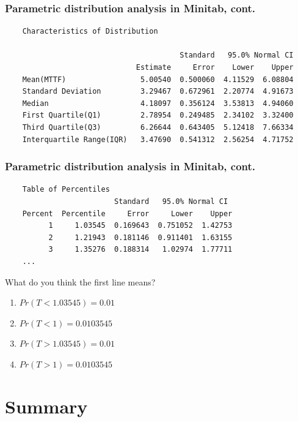 \begin{frame}[fragile]
\frametitle{Parametric distribution analysis in Minitab, cont.}
\begin{verbatim}
    Characteristics of Distribution

                                        Standard   95.0% Normal CI
                              Estimate     Error    Lower    Upper
    Mean(MTTF)                 5.00540  0.500060  4.11529  6.08804
    Standard Deviation         3.29467  0.672961  2.20774  4.91673
    Median                     4.18097  0.356124  3.53813  4.94060
    First Quartile(Q1)         2.78954  0.249485  2.34102  3.32400
    Third Quartile(Q3)         6.26644  0.643405  5.12418  7.66334
    Interquartile Range(IQR)   3.47690  0.541312  2.56254  4.71752
\end{verbatim}
\end{frame}

\begin{frame}[fragile]
\frametitle{Parametric distribution analysis in Minitab, cont.}
\begin{verbatim}
    Table of Percentiles
                         Standard   95.0% Normal CI
    Percent  Percentile     Error     Lower    Upper
          1     1.03545  0.169643  0.751052  1.42753
          2     1.21943  0.181146  0.911401  1.63155
          3     1.35276  0.188314   1.02974  1.77711
    ...
\end{verbatim}
\vskip10pt
\begin{clicker}{What do you think the first line means?}
\begin{enumerate}
\item $Pr(T<1.03545)=0.01$ %
\item $Pr(T<1)=0.0103545$
\item $Pr(T>1.03545)=0.01$
\item $Pr(T>1)=0.0103545$
\end{enumerate}
\end{clicker}
\end{frame}

\section[Summary]{Summary}
\subsection{}
\begin{frame}
\end{frame}

